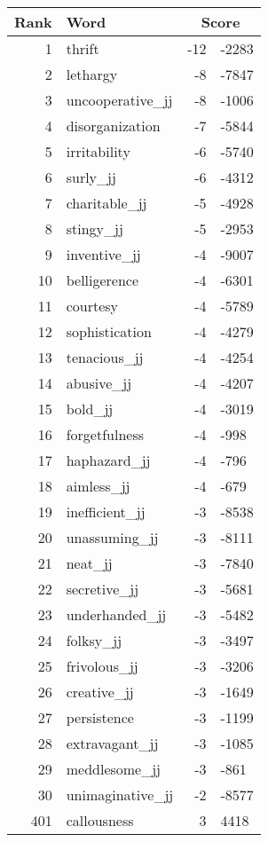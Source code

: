 \begin{longtable}[!htbp]{| rlr@{.}l |}
    \hline
    \textbf{Rank} & \textbf{Word} & \multicolumn{2}{c|}{\textbf{Score}} \\
    \hline
    \endhead
    1 & thrift & -12 & -2283 \\
    2 & lethargy & -8 & -7847 \\
    3 & uncooperative\_jj & -8 & -1006 \\
    4 & disorganization & -7 & -5844 \\
    5 & irritability & -6 & -5740 \\
    6 & surly\_jj & -6 & -4312 \\
    7 & charitable\_jj & -5 & -4928 \\
    8 & stingy\_jj & -5 & -2953 \\
    9 & inventive\_jj & -4 & -9007 \\
    10 & belligerence & -4 & -6301 \\
    11 & courtesy & -4 & -5789 \\
    12 & sophistication & -4 & -4279 \\
    13 & tenacious\_jj & -4 & -4254 \\
    14 & abusive\_jj & -4 & -4207 \\
    15 & bold\_jj & -4 & -3019 \\
    16 & forgetfulness & -4 & -998 \\
    17 & haphazard\_jj & -4 & -796 \\
    18 & aimless\_jj & -4 & -679 \\
    19 & inefficient\_jj & -3 & -8538 \\
    20 & unassuming\_jj & -3 & -8111 \\
    21 & neat\_jj & -3 & -7840 \\
    22 & secretive\_jj & -3 & -5681 \\
    23 & underhanded\_jj & -3 & -5482 \\
    24 & folksy\_jj & -3 & -3497 \\
    25 & frivolous\_jj & -3 & -3206 \\
    26 & creative\_jj & -3 & -1649 \\
    27 & persistence & -3 & -1199 \\
    28 & extravagant\_jj & -3 & -1085 \\
    29 & meddlesome\_jj & -3 & -861 \\
    30 & unimaginative\_jj & -2 & -8577 \\
    401 & callousness & 3 & 4418 \\

\end{longtable}
